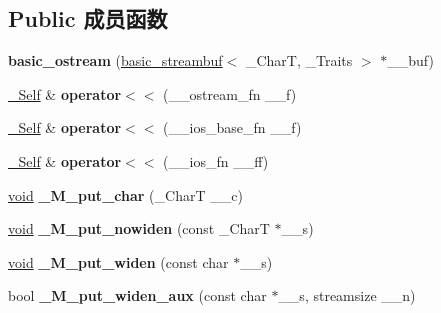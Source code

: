 \subsection*{Public 成员函数}
\begin{DoxyCompactItemize}
\item 
\mbox{\label{classbasic__ostream_a8fb0b0687f308ceaab3dfffd9e124df7}} 
{\bfseries basic\+\_\+ostream} (\hyperlink{classbasic__streambuf}{basic\+\_\+streambuf}$<$ \+\_\+\+CharT, \+\_\+\+Traits $>$ $\ast$\+\_\+\+\_\+buf)
\item 
\mbox{\label{classbasic__ostream_a6d6b4e855b40770a6df3f29c2886f8ca}} 
\hyperlink{classbasic__ostream}{\+\_\+\+Self} \& {\bfseries operator$<$$<$} (\+\_\+\+\_\+ostream\+\_\+fn \+\_\+\+\_\+f)
\item 
\mbox{\label{classbasic__ostream_a1791704cba70678d1b8ad8ca9f00fc07}} 
\hyperlink{classbasic__ostream}{\+\_\+\+Self} \& {\bfseries operator$<$$<$} (\+\_\+\+\_\+ios\+\_\+base\+\_\+fn \+\_\+\+\_\+f)
\item 
\mbox{\label{classbasic__ostream_a37bf91d42f8c1367275f9777a12c606d}} 
\hyperlink{classbasic__ostream}{\+\_\+\+Self} \& {\bfseries operator$<$$<$} (\+\_\+\+\_\+ios\+\_\+fn \+\_\+\+\_\+ff)
\item 
\mbox{\label{classbasic__ostream_a487b4130adb3c4a072e17ea595837f96}} 
\hyperlink{interfacevoid}{void} {\bfseries \+\_\+\+M\+\_\+put\+\_\+char} (\+\_\+\+CharT \+\_\+\+\_\+c)
\item 
\mbox{\label{classbasic__ostream_a07eb0727c97816fd47e014a37ead5cab}} 
\hyperlink{interfacevoid}{void} {\bfseries \+\_\+\+M\+\_\+put\+\_\+nowiden} (const \+\_\+\+CharT $\ast$\+\_\+\+\_\+s)
\item 
\mbox{\label{classbasic__ostream_a1a3a72ffa5dfaa0cdfeb3537152e7027}} 
\hyperlink{interfacevoid}{void} {\bfseries \+\_\+\+M\+\_\+put\+\_\+widen} (const char $\ast$\+\_\+\+\_\+s)
\item 
\mbox{\label{classbasic__ostream_aab0f020c67a07cf88d7eed8a373c9938}} 
bool {\bfseries \+\_\+\+M\+\_\+put\+\_\+widen\+\_\+aux} (const char $\ast$\+\_\+\+\_\+s, streamsize \+\_\+\+\_\+n)

\end{DoxyCompactItemize}
